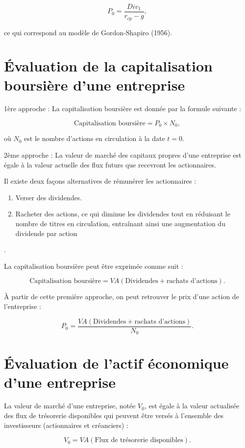 \documentclass[a4paper, 12pt]{report}
\begin{document}
\[
P_0 = \frac{Div_1}{r_{cp} - g},
\]

ce qui correspond au modèle de Gordon-Shapiro (1956).

\section{Évaluation de la capitalisation boursière d'une entreprise}

1ère approche : La capitalisation boursière est donnée par la formule suivante :

\[
\text{Capitalisation boursière} = P_0 \times N_0,
\]

où \( N_0 \) est le nombre d'actions en circulation à la date \( t = 0 \).

2ème approche : La valeur de marché des capitaux propres d'une entreprise est égale à la valeur actuelle des flux futurs que recevront les actionnaires.

Il existe deux façons alternatives de rémunérer les actionnaires :

\begin{enumerate}
	\item Verser des dividendes.
	\item Racheter des actions, ce qui diminue les dividendes tout en réduisant le nombre de titres en circulation, entraînant ainsi une augmentation du dividende par action
\end{enumerate}.

La capitalisation boursière peut être exprimée comme suit :

\[
\text{Capitalisation boursière} = VA(\text{Dividendes} + \text{rachats d'actions}).
\]

À partir de cette première approche, on peut retrouver le prix d'une action de l'entreprise :

\[
P_0 = \frac{VA(\text{Dividendes} + \text{rachats d'actions})}{N_0}.
\]

\section{Évaluation de l'actif économique d'une entreprise}

La valeur de marché d'une entreprise, notée \( V_0 \), est égale à la valeur actualisée des flux de trésorerie disponibles qui peuvent être versés à l'ensemble des investisseurs (actionnaires et créanciers) :

\[
V_0 = VA(\text{Flux de trésorerie disponibles}).
\]
\end{document}
